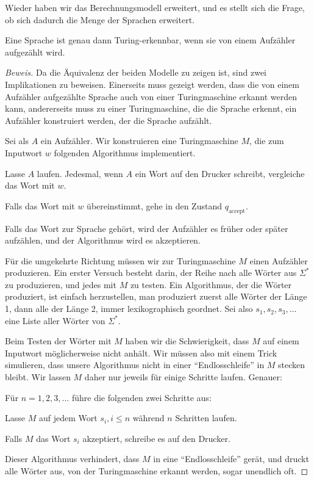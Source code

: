 Wieder haben wir das Berechnungsmodell erweitert, und es stellt sich
die Frage, ob sich dadurch die Menge der Sprachen erweitert.

\begin{satz}
%
Eine Sprache ist genau dann Turing-erkennbar, wenn sie
von einem Aufzähler aufgezählt wird.\end{satz}

\begin{proof}[Beweis]
Da die Äquivalenz der beiden Modelle zu zeigen ist, sind zwei Implikationen
zu beweisen. Einerseits muss gezeigt werden, dass die von einem
Aufzähler aufgezählte Sprache auch von einer Turingmaschine
erkannt werden kann, andererseits muss zu einer Turingmaschine, die
die Sprache erkennt, ein Aufzähler konstruiert werden, der die Sprache
aufzählt.

Sei als $A$ ein Aufzähler. Wir konstruieren eine Turingmaschine $M$, die
zum Inputwort $w$ folgenden Algorithmus implementiert.
\begin{compactenum}
\item Lasse $A$ laufen. Jedesmal, wenn $A$ ein Wort auf den Drucker schreibt,
vergleiche das Wort mit $w$.
\item Falls das Wort mit $w$ übereinstimmt, gehe in den Zustand
$q_{\text{accept}}$.
\end{compactenum}
Falls das Wort zur Sprache gehört, wird der Aufzähler es früher
oder später aufzählen, und der Algorithmus wird es akzeptieren.

Für die umgekehrte Richtung müssen wir zur Turingmaschine $M$
einen Aufzähler produzieren.
Ein erster Versuch besteht darin, der Reihe nach alle Wörter aus
$\Sigma^*$ zu produzieren, und jedes mit $M$ zu testen.
Ein Algorithmus, der die Wörter produziert, ist einfach herzustellen,
man produziert zuerst alle Wörter der Länge 1, dann alle der Länge 2,
immer lexikographisch geordnet.
Sei also $s_1,s_2,s_3,\dots$ eine Liste aller Wörter von $\Sigma^*$.

Beim Testen der Wörter mit $M$
haben wir die Schwierigkeit, dass $M$ auf einem Inputwort
möglicherweise nicht anhält. Wir müssen also mit einem Trick
simulieren, dass unsere Algorithmus nicht in einer ``Endlosschleife''
in $M$ stecken bleibt. Wir lassen $M$ daher nur jeweils für einige
Schritte laufen.
Genauer:
\begin{compactenum}
\item Für $n=1,2,3,\dots$ führe die folgenden zwei Schritte aus:
\item Lasse $M$ auf jedem Wort $s_i, i \le n$ während $n$ Schritten
laufen.
\item Falls $M$ das Wort $s_i$ akzeptiert, schreibe es auf den Drucker.
\end{compactenum}
Dieser Algorithmus verhindert, dass $M$ in eine ``Endlosschleife''
gerät, und druckt alle Wörter aus, von der Turingmaschine erkannt
werden, sogar unendlich oft.
\end{proof}

